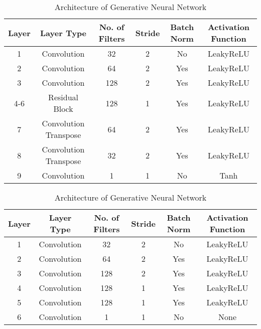 \begin{table}[htbp]
  \centering
  \begin{subtable}{\linewidth}
  \caption{Architecture of Generator}
    \begin{tabular}{c|ccccc}
    \toprule
    \textbf{Layer} & \textbf{Layer Type} & \textbf{No. of Filters} & \textbf{Stride}&  \textbf{Batch Norm} &\textbf{Activation Function} \\
    \midrule
    1    & Convolution	 & 32& 2 & No& LeakyReLU \\
    2    & Convolution & 64 & 2  & Yes& LeakyReLU \\
    3    & Convolution & 128 & 2 &  Yes &LeakyReLU  \\
    4-6    & Residual Block & 128 & 1 & Yes & LeakyReLU \\
    7    & Convolution Transpose & 64 & 2& Yes  & LeakyReLU\\
    8    & Convolution Transpose & 32 & 2 & Yes & LeakyReLU\\
    9    & Convolution & 1 & 1  & No & Tanh\\
    \bottomrule
    \end{tabular}%
  \label{tab:generator_arichitecture}%
  \end{subtable}
    \begin{subtable}{\linewidth}
  \caption{Architecture of Discriminator}
    \begin{tabular}{c|ccccc}
    \toprule
    \textbf{Layer} & \textbf{Layer Type} & \textbf{No. of Filters} & \textbf{Stride}&  \textbf{Batch Norm} &\textbf{Activation Function} \\
    \midrule
    1    & Convolution	 & 32& 2 & No& LeakyReLU \\
    2    & Convolution & 64 & 2  & Yes& LeakyReLU \\
    3    & Convolution & 128 & 2 &  Yes &LeakyReLU  \\
    4    & Convolution  & 128 & 1& Yes  & LeakyReLU\\
    5    & Convolution & 128 & 1 & Yes & LeakyReLU\\
    6    & Convolution & 1 & 1  & No & None\\
    \bottomrule
    \end{tabular}%
  \label{tab:discriminator_arichitecture}%
  \end{subtable}%
  \caption{Architecture of Generative Neural Network}
  \label{tab:network_arch}%
\end{table}%

